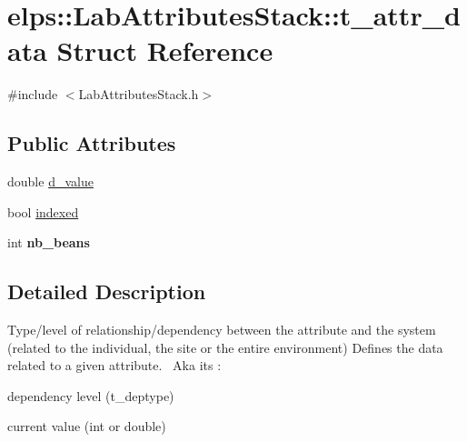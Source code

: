 \hypertarget{structelps_1_1_lab_attributes_stack_1_1t__attr__data}{\section{elps\+:\+:Lab\+Attributes\+Stack\+:\+:t\+\_\+attr\+\_\+data Struct Reference}
\label{structelps_1_1_lab_attributes_stack_1_1t__attr__data}
}


{\ttfamily \#include $<$Lab\+Attributes\+Stack.\+h$>$}

\subsection*{Public Attributes}
\begin{DoxyCompactItemize}
\item 
double \hyperlink{structelps_1_1_lab_attributes_stack_1_1t__attr__data_a19980f86ba84b14f9cdddca2b041d754}{d\+\_\+value}
\item 
bool \hyperlink{structelps_1_1_lab_attributes_stack_1_1t__attr__data_aa85d8c64cdfc9b5e62e64903efa96d7b}{indexed}
\item 
\hypertarget{structelps_1_1_lab_attributes_stack_1_1t__attr__data_a377207e3a4a02070961f47ffadecbee7}{int {\bfseries nb\+\_\+beans}}\label{structelps_1_1_lab_attributes_stack_1_1t__attr__data_a377207e3a4a02070961f47ffadecbee7}

\end{DoxyCompactItemize}


\subsection{Detailed Description}
Type/level of relationship/dependency between the attribute and the system (related to the individual, the site or the entire environment) Defines the data related to a given attribute.~\newline
 Aka its \+:
\begin{DoxyItemize}
\item dependency level (t\+\_\+deptype)
\item current value (int or double) 
\end{DoxyItemize}

